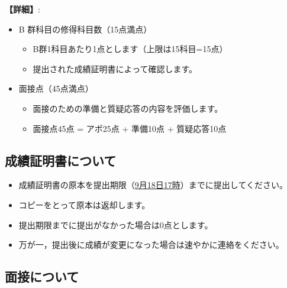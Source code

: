 \documentclass[paper=a4paper,fontsize=10.4pt]{jlreq}
\begin{document}
\noindent
{\bfseries 【詳細】}:
\begin{itemize}[topsep=0pt]
  \item B 群科目の修得科目数（15点満点）
    \begin{itemize}
      \item B群1科目あたり1点とします（上限は15科目=15点）
      \item 提出された成績証明書によって確認します。
    \end{itemize}
  \item 面接点（45点満点）
    \begin{itemize}
      \item 面接のための準備と質疑応答の内容を評価します。
      \item 面接点45点 = アポ25点 + 準備10点 + 質疑応答10点
    \end{itemize}
\end{itemize}

\subsection*{成績証明書について}

\begin{itemize}
\item 成績証明書の原本を提出期限（\underline{9月18日17時}）までに提出してください。
\item コピーをとって原本は返却します。
\item 提出期限までに提出がなかった場合は0点とします。
\item 万が一，提出後に成績が変更になった場合は速やかに連絡をください。
\end{itemize}

\subsection*{面接について}
\end{document}
